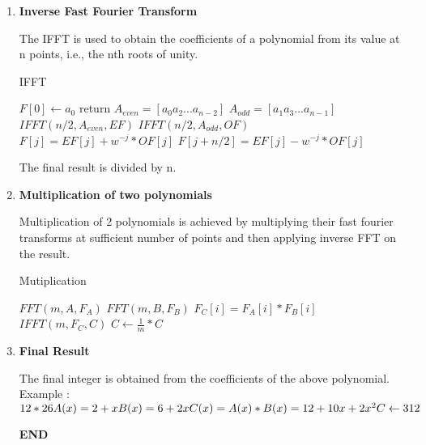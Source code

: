 \documentclass[a4paper,11pt]{article}
\begin{document}
\begin{enumerate}
 \item \textbf{Inverse Fast Fourier Transform}
 
 The IFFT is used to obtain the coefficients of a polynomial from its value at n points, i.e., the nth roots of unity.
 
    \begin{algorithm}
    \caption{IFFT}
    \begin{algorithmic}[1]
        \State $F\left[0\right] \gets a_{0}$ 
        \State return
    \EndIf
    \State $A_{even} = \left[ a_{0} a_{2} ... a_{n-2} \right]$
    \State $A_{odd} = \left[ a_{1} a_{3} ... a_{n-1} \right]$
    \State $IFFT(n/2, A_{even}, EF)$
    \State $IFFT(n/2, A_{odd}, OF)$
        \State $F\left[j\right] = EF\left[j\right] + w^{-j}*OF\left[j\right]$
        \State $F\left[j+n/2\right] = EF\left[j\right] - w^{-j}*OF\left[j\right]$
    \EndFor
    \end{algorithmic}
    \end{algorithm}
    
  The final result is divided by n.
  
  \item \textbf{Multiplication of two polynomials}
  
  Multiplication of 2 polynomials is achieved by multiplying their fast fourier transforms at sufficient number of points and then applying inverse FFT on the result.
  
    \begin{algorithm}
    \caption{Mutiplication}
    \begin{algorithmic}[1]
    \State $FFT(m, A, F_{A})$
    \State $FFT(m, B, F_{B})$
        \State $F_{C}\left[i\right] = F_{A}\left[i\right]*F_{B}\left[i\right]$
    \EndFor
    \State $IFFT(m, F_{C}, C)$
    \State $C \gets \frac{1}{m} * C$  
    \end{algorithmic}
    \end{algorithm}
  
  \item \textbf{Final Result}
  
  The final integer is obtained from the coefficients of the above polynomial.\\
  Example :\\
  $12*26\\
   A(x) = 2 + x\\
   B(x) = 6 + 2x\\
   C(x) = A(x)*B(x) = 12 + 10x + 2x^2\\
   C \leftarrow 312\\$
   
   \textbf{END}
\end{enumerate}   
\end{document}
